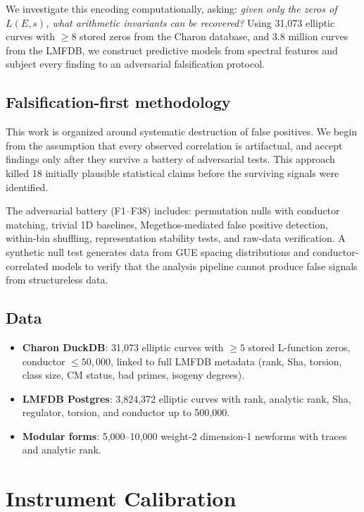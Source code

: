 \documentclass[11pt,a4paper]{article}
\begin{document}
We investigate this encoding computationally, asking: \emph{given only the zeros of $L(E,s)$, what arithmetic invariants can be recovered?} Using 31,073 elliptic curves with ${\geq}8$ stored zeros from the Charon database, and 3.8 million curves from the LMFDB, we construct predictive models from spectral features and subject every finding to an adversarial falsification protocol.

\subsection{Falsification-first methodology}

This work is organized around systematic destruction of false positives. We begin from the assumption that every observed correlation is artifactual, and accept findings only after they survive a battery of adversarial tests. This approach killed 18 initially plausible statistical claims before the surviving signals were identified.

The adversarial battery (F1--F38) includes: permutation nulls with conductor matching, trivial 1D baselines, Megethos-mediated false positive detection, within-bin shuffling, representation stability tests, and raw-data verification. A synthetic null test generates data from GUE spacing distributions and conductor-correlated models to verify that the analysis pipeline cannot produce false signals from structureless data.

\subsection{Data}

\begin{itemize}[nosep]
  \item \textbf{Charon DuckDB}: 31,073 elliptic curves with ${\geq}5$ stored L-function zeros, conductor ${\leq}50{,}000$, linked to full LMFDB metadata (rank, Sha, torsion, class size, CM status, bad primes, isogeny degrees).
  \item \textbf{LMFDB Postgres}: 3,824,372 elliptic curves with rank, analytic rank, Sha, regulator, torsion, and conductor up to 500,000.
  \item \textbf{Modular forms}: 5,000--10,000 weight-2 dimension-1 newforms with traces and analytic rank.
\end{itemize}

\section{Instrument Calibration}
\end{document}
